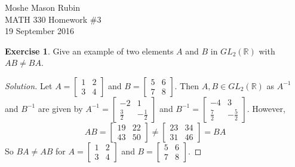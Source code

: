 \documentclass{article}
\theoremstyle{definition}
\newtheorem{theorem}{Exercise}[section]
\newcommand{\R}{\mathbb{R}}
\begin{document}
	\begin{flushright}
		Moshe Mason Rubin\\MATH 330 Homework \#3\\19 September 2016
	\end{flushright}
	

	\setcounter{theorem}{7}
	\begin{theorem}
		Give an example of two elements $A$ and $B$ in $GL_2(\R)$ with $AB\not=BA$. 
	\end{theorem}
	\begin{proof}[Solution]
		Let $A=\left[\begin{smallmatrix}
		1&  2\\ 
		3&  4
		\end{smallmatrix} \right]$ and $B=\left[\begin{smallmatrix}
		5&  6\\ 
		7&  8
		\end{smallmatrix} \right]$. Then $A,B\in GL_2(\R)$ as $A^{-1}$ and $B^{-1}$ are given by $A^{-1}=\left[\begin{smallmatrix}
		-2&  1\\ 
		\frac{3}{2}& -\frac{1}{2} 
		\end{smallmatrix} \right]$ and ${B^{-1}=\left[\begin{smallmatrix}
		-4&  3\\ 
		\frac{7}{2}&  -\frac{5}{2}
		\end{smallmatrix} \right]}$. However, \[
		AB = \begin{bmatrix}
		19 & 22 \\ 
		43 & 50
		\end{bmatrix} \not = \begin{bmatrix}
		23 & 34 \\ 
		31 & 46
		\end{bmatrix} =BA
		\] So $BA\not=AB$ for $A=\left[\begin{smallmatrix}
		1&  2\\ 
		3&  4
		\end{smallmatrix} \right]$ and $B=\left[\begin{smallmatrix}
		5&  6\\ 
		7&  8
		\end{smallmatrix} \right]$.
	\end{proof}
	
\end{document}
